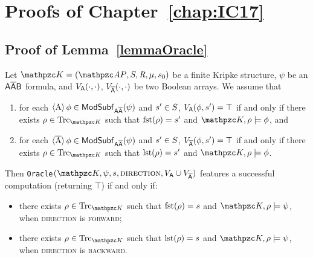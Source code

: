 \chapter{Proofs of Chapter~\ref{chap:IC17}}
\minitoc\mtcskip

\section{Proof of Lemma~\ref{lemmaOracle}}\label{proof:lemmaOracle}

\begin{lemma*}[\ref{lemmaOracle}]
Let $\Ku=\KuDef$ be a finite Kripke structure, $\psi$ be an $\mathsf{A\overline{A}B}$ formula, and $V_{\mathsf{A}}(\cdot,\cdot)$, $V_{\mathsf{\overline{A}}}(\cdot,\cdot)$ be two Boolean arrays. We assume that 
\begin{enumerate}
	\item for each $\operatorname{\langle A\rangle} \phi\in\mathsf{ModSubf}_{\mathsf{A\overline{A}}}(\psi)$ and $s'\in S$, $V_{\mathsf{A}}(\phi,s')=\top$ if and only if there exists $\rho\in\Trk_{\Ku}$ such that $\operatorname{fst}(\rho)=s'$ and $\Ku,\rho\models \phi$, and
	\item for each $\operatorname{\langle \overline{A}\rangle} \phi\in\mathsf{ModSubf}_{\mathsf{A\overline{A}}}(\psi)$ and $s'\in S$, $V_{\mathsf{\overline{A}}}(\phi,s')=\top$ if and only if there exists $\rho\in\Trk_{\Ku}$ such that $\operatorname{lst}(\rho)=s'$ and $\Ku,\rho\models \phi$.
\end{enumerate}
Then \texttt{Oracle}$(\Ku,\psi,s,\textsc{direction},V_{\A}\cup V_{\Abar})$ features a successful computation (returning $\top$) if and only if:
\begin{itemize}
	\item there exists $\rho\in\Trk_{\Ku}$ such that $\operatorname{fst}(\rho)=s$ and $\Ku,\rho\models \psi$, when \textsc{direction} is \textsc{forward};
	\item there exists $\rho\in\Trk_{\Ku}$ such that $\operatorname{lst}(\rho)=s$ and $\Ku,\rho\models \psi$, when \textsc{direction} is \textsc{backward}.
\end{itemize}
\end{lemma*}

